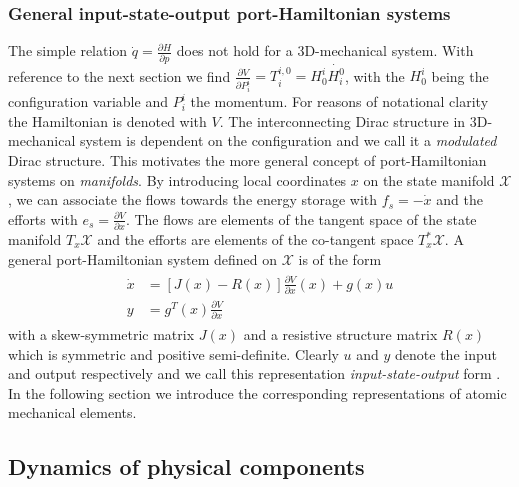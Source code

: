 \documentclass[a4paper,twoside, openright,12pt]{report}
\begin{document}
\subsubsection{General input-state-output port-Hamiltonian systems}
The simple relation $\dot{q}=\frac{\partial H}{\partial p}$ does not hold for a 3D-mechanical system. With reference to the next section we find $\frac{\partial V}{\partial P_i^i} = T_i^{i,0} = H_0^i \dot{H_i^0}$, with the $H_0^i$ being the configuration variable and $P_i^i$ the momentum. For reasons of notational clarity the Hamiltonian is denoted with $V$. The interconnecting Dirac structure in 3D-mechanical system  is dependent on the configuration and we call it a \emph{modulated} Dirac structure. This motivates the more general concept of port-Hamiltonian systems on \emph{manifolds}. By introducing local coordinates $x$ on the state manifold $\mathcal{X}$, we can associate the flows towards the energy storage with $f_s = -\dot{x}$ and the efforts with $e_s = \frac{\partial V}{\partial x}$. The flows are elements of the tangent space of the state manifold $T_x\mathcal{X}$ and the efforts are elements of the co-tangent space $T_x^*\mathcal{X}$. A general port-Hamiltonian system defined on $\mathcal{X}$ is of the form
\begin{eqnarray}
\begin{aligned}
\dot{x} &= [J(x)-R(x)]\frac{\partial V}{\partial x}(x) + g(x) u \\
y &= g^T(x)\frac{\partial V}{\partial x}
\end{aligned}
\end{eqnarray}
with a skew-symmetric matrix $J(x)$ and a resistive structure matrix $R(x)$ which is symmetric and positive semi-definite. Clearly $u$ and $y$ denote the input and output respectively and we call this representation \emph{input-state-output} form \cite{Schaft_14}. In the following section we introduce the corresponding representations of atomic mechanical elements.




\subsection{Dynamics of physical components}
\end{document}
